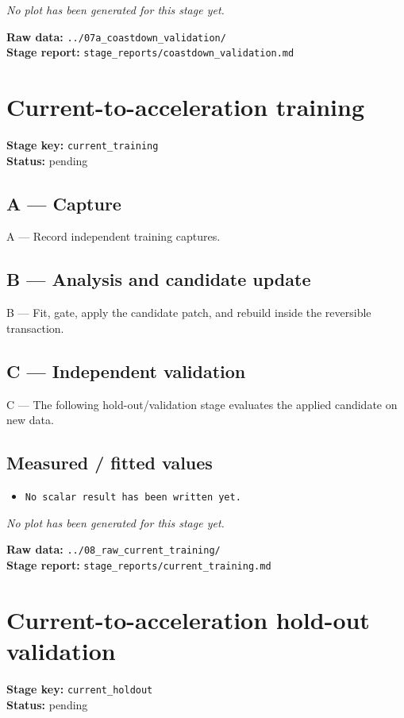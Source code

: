 \documentclass[11pt,a4paper]{article}
\begin{document}
\textit{No plot has been generated for this stage yet.}

\vfill
\textbf{Raw data:} \texttt{../07a\_coastdown\_validation/}\\
\textbf{Stage report:} \texttt{stage\_reports/coastdown\_validation.md}
\clearpage
\small
\section*{Current-to-acceleration training}
\textbf{Stage key:} \texttt{current\_training}\\
\textbf{Status:} pending\\

\subsection*{A --- Capture}
A — Record independent training captures.

\subsection*{B --- Analysis and candidate update}
B — Fit, gate, apply the candidate patch, and rebuild inside the reversible transaction.

\subsection*{C --- Independent validation}
C — The following hold-out/validation stage evaluates the applied candidate on new data.

\subsection*{Measured / fitted values}
\begin{itemize}\setlength\itemsep{0pt}
\item \texttt{No scalar result has been written yet.}
\end{itemize}

\textit{No plot has been generated for this stage yet.}

\vfill
\textbf{Raw data:} \texttt{../08\_raw\_current\_training/}\\
\textbf{Stage report:} \texttt{stage\_reports/current\_training.md}
\clearpage
\small
\section*{Current-to-acceleration hold-out validation}
\textbf{Stage key:} \texttt{current\_holdout}\\
\textbf{Status:} pending\\
\end{document}
